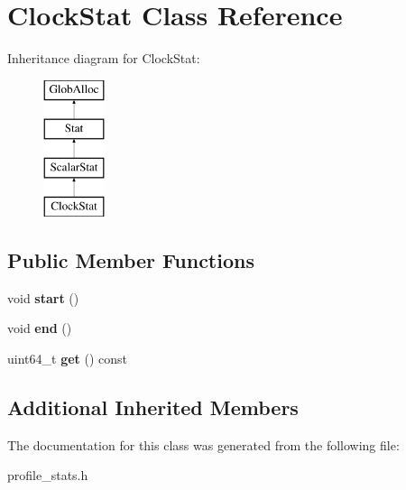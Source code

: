 \hypertarget{classClockStat}{\section{Clock\-Stat Class Reference}
\label{classClockStat}
}
Inheritance diagram for Clock\-Stat\-:\begin{figure}[H]
\begin{center}
\leavevmode
\includegraphics[height=4.000000cm]{classClockStat}
\end{center}
\end{figure}
\subsection*{Public Member Functions}
\begin{DoxyCompactItemize}
\item 
\hypertarget{classClockStat_aa45f73112d2c9f8ad79f33a50610577d}{void {\bfseries start} ()}\label{classClockStat_aa45f73112d2c9f8ad79f33a50610577d}

\item 
\hypertarget{classClockStat_a8bbe37eb00c3fe0fb0615df8e3f9f16a}{void {\bfseries end} ()}\label{classClockStat_a8bbe37eb00c3fe0fb0615df8e3f9f16a}

\item 
\hypertarget{classClockStat_ac5a756bd6bea1ade23d31630e1b5c0ca}{uint64\-\_\-t {\bfseries get} () const }\label{classClockStat_ac5a756bd6bea1ade23d31630e1b5c0ca}

\end{DoxyCompactItemize}
\subsection*{Additional Inherited Members}


The documentation for this class was generated from the following file\-:\begin{DoxyCompactItemize}
\item 
profile\-\_\-stats.\-h\end{DoxyCompactItemize}
